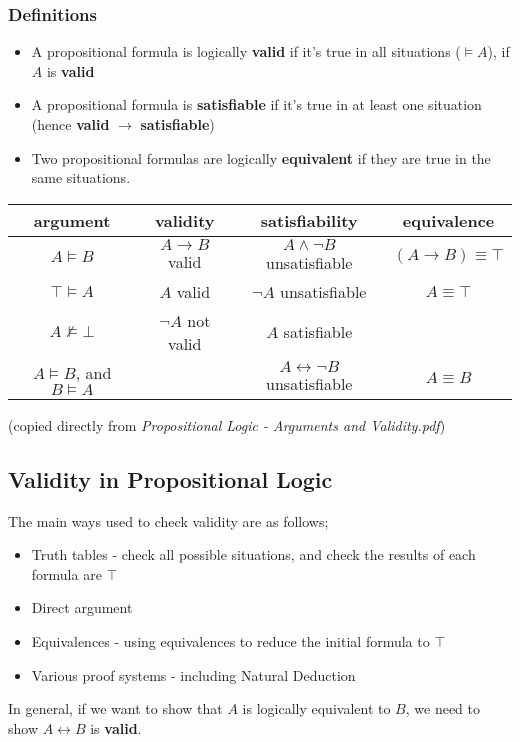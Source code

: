 \documentclass[a4paper, 12pt]{article}
\begin{document}
            \subsubsection*{Definitions}
                \begin{itemize}
                    \itemsep0em
                    \item A propositional formula is logically \textbf{valid} if it's true in all situations ($\vDash A$), if $A$ is \textbf{valid}
                    \item A propositional formula is \textbf{satisfiable} if it's true in at least one situation (hence \textbf{valid} $\rightarrow$ \textbf{satisfiable})
                    \item Two propositional formulas are logically \textbf{equivalent} if they are true in the same situations.
                \end{itemize}
                \begin{center}
                    \begin{tabular}{|c|c|c|c|}
                        \hline
                        argument & validity & satisfiability & equivalence \\
                        \hline
                        $A \vDash B$ & $A \rightarrow B$ valid & $A \land \neg B$ unsatisfiable & $(A \rightarrow B) \equiv \top$ \\
                        $\top \vDash A$ & $A$ valid & $\neg A$ unsatisfiable & $A \equiv \top$ \\
                        $A \nvDash \bot$ & $\neg A$ not valid & $A$ satisfiable & \\
                        $A \vDash B$, and $B \vDash A$ & & $A \leftrightarrow \neg B$ unsatisfiable & $A \equiv B$ \\
                        \hline
                    \end{tabular}
                    \medskip

                    (copied directly from \textit{Propositional Logic - Arguments and Validity.pdf})
                \end{center}
        \subsection*{Validity in Propositional Logic}
            The main ways used to check validity are as follows;
            \begin{itemize}
                \itemsep0em
                \item Truth tables - check all possible situations, and check the results of each formula are $\top$
                \item Direct argument
                \item Equivalences - using equivalences to reduce the initial formula to $\top$
                \item Various proof systems - including Natural Deduction
            \end{itemize}
            In general, if we want to show that $A$ is logically equivalent to $B$, we need to show $A \leftrightarrow B$ is \textbf{valid}.
\end{document}
